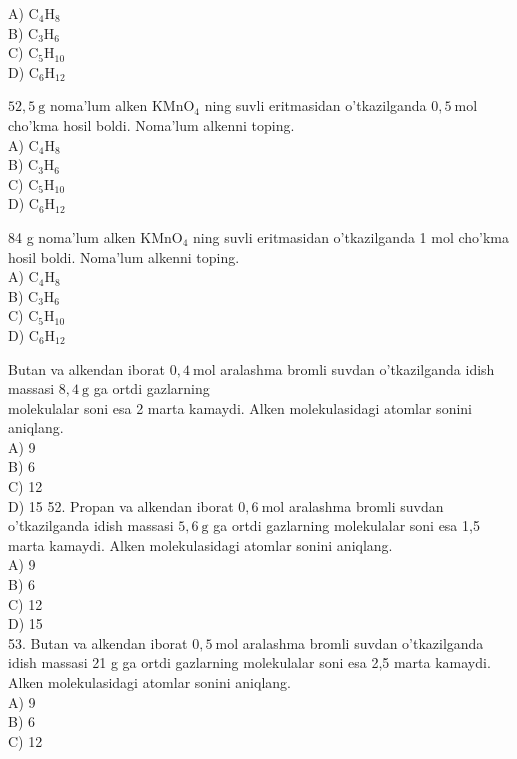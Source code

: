 A) $\mathrm{C}_{4} \mathrm{H}_{8}$\\
B) $\mathrm{C}_{3} \mathrm{H}_{6}$\\
C) $\mathrm{C}_{5} \mathrm{H}_{10}$\\
D) $\mathrm{C}_{6} \mathrm{H}_{12}$
  \item $52,5 \mathrm{~g}$ noma'lum alken $\mathrm{KMnO}_{4}$ ning suvli eritmasidan o'tkazilganda $0,5 \mathrm{~mol}$ cho'kma hosil boldi. Noma'lum alkenni toping.\\
A) $\mathrm{C}_{4} \mathrm{H}_{8}$\\
B) $\mathrm{C}_{3} \mathrm{H}_{6}$\\
C) $\mathrm{C}_{5} \mathrm{H}_{10}$\\
D) $\mathrm{C}_{6} \mathrm{H}_{12}$
  \item 84 g noma'lum alken $\mathrm{KMnO}_{4}$ ning suvli eritmasidan o'tkazilganda 1 mol cho'kma hosil boldi. Noma'lum alkenni toping.\\
A) $\mathrm{C}_{4} \mathrm{H}_{8}$\\
B) $\mathrm{C}_{3} \mathrm{H}_{6}$\\
C) $\mathrm{C}_{5} \mathrm{H}_{10}$\\
D) $\mathrm{C}_{6} \mathrm{H}_{12}$
  \item Butan va alkendan iborat $0,4 \mathrm{~mol}$ aralashma bromli suvdan o'tkazilganda idish massasi $8,4 \mathrm{~g}$ ga ortdi gazlarning\\
molekulalar soni esa 2 marta kamaydi. Alken molekulasidagi atomlar sonini aniqlang.\\
A) 9\\
B) 6\\
C) 12\\
D) 15
52. Propan va alkendan iborat $0,6 \mathrm{~mol}$ aralashma bromli suvdan o'tkazilganda idish massasi $5,6 \mathrm{~g}$ ga ortdi gazlarning molekulalar soni esa 1,5 marta kamaydi. Alken molekulasidagi atomlar sonini aniqlang.\\
A) 9\\
B) 6\\
C) 12\\
D) 15\\
53. Butan va alkendan iborat $0,5 \mathrm{~mol}$ aralashma bromli suvdan o'tkazilganda idish massasi 21 g ga ortdi gazlarning molekulalar soni esa 2,5 marta kamaydi. Alken molekulasidagi atomlar sonini aniqlang.\\
A) 9\\
B) 6\\
C) 12\\
